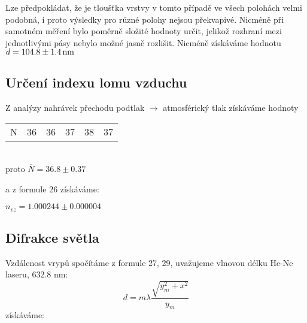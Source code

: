 \documentclass[czech,11pt,a4paper]{article}
\begin{document}
		
		\begin{multicols}{2}
			
		Lze předpokládat, že je tloušťka vrstvy v tomto případě ve všech polohách velmi podobná, i proto výsledky pro různé polohy nejsou překvapivé. Nicméně při samotném měření bylo poměrně složité hodnoty určit, jelikož rozhraní mezi jednotlivými pásy nebylo možné jasně rozlišit. Nicméně získáváme hodnotu
		$d = 104.8 \pm 1.4 \,\rm nm$
		
		\subsection{Určení indexu lomu vzduchu}
		
		Z analýzy nahrávek přechodu podtlak $\rightarrow$ atmosférický tlak získáváme hodnoty
		
		\begin{tabular}{l|lllll}
		N & 36 & 36 & 37 & 38 & 37
		\end{tabular} \\
		
		proto $\overline{N} = 36.8 \pm 0.37$
		
		a z formule 26 získáváme:
		
		$n_{vz} = 1.000244 \pm 0.000004$ 
		
		\subsection{Difrakce světla}
		Vzdálenost vrypů spočítáme z formule 27, 29, uvažujeme vlnovou délku He-Ne laseru, 632.8 nm:
		\begin{equation}
			d = m \lambda \frac{\sqrt{y_m^2 + x^2}}{y_m}
		\end{equation}
		získáváme:
		\end{multicols}
\end{document}
